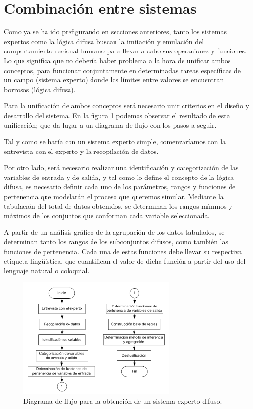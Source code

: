 \documentclass[a4paper, 11pt, titlepage]{article}
\begin{document}
\section{Combinación entre sistemas}\label{combinacion}

    Como ya se ha ido prefigurando en secciones anteriores, tanto los sistemas expertos como la lógica 
    difusa buscan la imitación y emulación del comportamiento racional humano para llevar a cabo sus 
    operaciones y funciones. Lo que significa que no debería haber problema a la hora de unificar ambos 
    conceptos, para funcionar conjuntamente en determinadas tareas específicas de un campo (sistema 
    experto) donde los límites entre valores se encuentran borrosos (lógica difusa).

    Para la unificación de ambos conceptos será necesario unir criterios en el diseño y desarrollo del 
    sistema. En la figura \ref{diagramaflujoexperto} podemos observar el resultado de esta unificación; 
    que da lugar a un diagrama de flujo con los pasos a seguir. 

    Tal y como se haría con un sistema experto simple, comenzaríamos con la entrevista con el experto y 
    la recopilación de datos. 

    Por otro lado, será necesario realizar una identificación y categorización de las variables de entrada 
    y de salida, y tal como lo define el concepto 
    de la lógica difusa, es necesario definir cada uno de los parámetros, rangos y funciones de 
    pertenencia que modelarán el proceso que queremos simular. Mediante la tabulación del total de datos 
    obtenidos, se determinan los rangos mínimos y máximos de los conjuntos que conforman cada 
    variable seleccionada.

    A partir de un análisis gráfico de la agrupación de los datos tabulados, se determinan tanto los 
    rangos de los subconjuntos difusos, como también las funciones de pertenencia. Cada una de 
    estas funciones debe llevar su respectiva etiqueta lingüística, que cuantifican el valor de dicha 
    función a partir del uso del lenguaje natural o coloquial. 

    \begin{figure}[htp]
        \centering
        \includegraphics[width=0.7\textwidth]{resources/diagramaflujoexperto.png}
        \caption{Diagrama de flujo para la obtención de un sistema experto difuso.}
        \label{diagramaflujoexperto}
    \end{figure}
\end{document}
